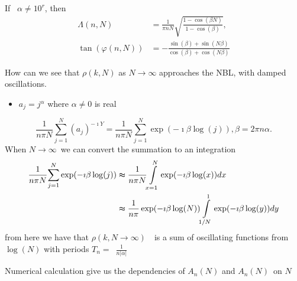 \documentclass[titlepage,fleqn]{article}%
\begin{document}
If \ $\alpha\neq10^{r}$, then%
\begin{align*}
\Lambda(n,N)  &  =\frac{1}{\pi nN}\sqrt{\frac{1-\cos(\beta N)}{1-\cos(\beta)}%
},\\
\tan(\varphi(n,N))  &  =-\frac{\sin(\beta)+\sin(N\beta)}{\cos(\beta
)+\cos(N\beta)}%
\end{align*}


How can we see that $\rho(k,N)$ as $N\rightarrow\infty$ approaches the NBL,
with damped oscillations.

\begin{itemize}
\item $a_{j}=j^{\alpha}$ where $\alpha\neq0$ is real
\end{itemize}

%

\[
\frac{1}{n\pi N}%
{\displaystyle\sum\limits_{j=1}^{N}}
(a_{j})^{-\imath Y}=\frac{1}{n\pi N}%
{\displaystyle\sum\limits_{j=1}^{N}}
\exp(-\imath\beta\log(j)),\beta=2\pi n\alpha.
\]
When $N\rightarrow\infty$\ we can convert the summation to an integration%
\begin{align}
\frac{1}{n\pi N}%
{\displaystyle\sum\limits_{j=1}^{N}}
\exp(-\imath\beta\log(j))  &  \thickapprox\frac{1}{n\pi N}%
{\displaystyle\int\limits_{x=1}^{N}}
\exp(-\imath\beta\log(x))dx\\
&  \thickapprox\frac{1}{n\pi}\exp(-\imath\beta\log(N))%
{\displaystyle\int\limits_{1/N}^{1}}
\exp(-\imath\beta\log(y))dy\nonumber
\end{align}
from here we have that $\rho(k,N\rightarrow\infty)$\ \ is a sum of oscillating
functions from $\log(N)$ with periods $T_{n}=$\ $\frac{1}{n\left\vert
\alpha\right\vert }$

Numerical calculation give us the dependencies of $A_{n}(N)$ and $A_{n}%
(N)$\ on $N$

\bigskip%
\end{document}
